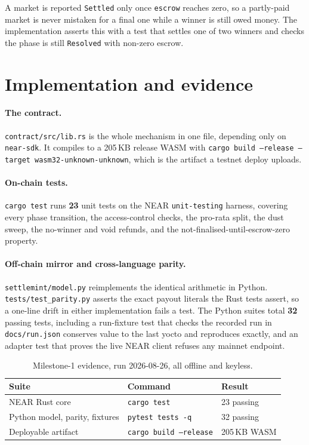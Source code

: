 \documentclass[11pt]{article}
\begin{document}
A market is reported \texttt{Settled} only once \texttt{escrow} reaches zero, so
a partly-paid market is never mistaken for a final one while a winner is still
owed money. The implementation asserts this with a test that settles one of two
winners and checks the phase is still \texttt{Resolved} with non-zero escrow.

\section{Implementation and evidence}

\paragraph{The contract.} \texttt{contract/src/lib.rs} is the whole mechanism in
one file, depending only on \texttt{near-sdk}. It compiles to a 205\,KB release
WASM with \texttt{cargo build --release --target wasm32-unknown-unknown}, which is
the artifact a testnet deploy uploads.

\paragraph{On-chain tests.} \texttt{cargo test} runs \textbf{23} unit tests on
the NEAR \texttt{unit-testing} harness, covering every phase transition, the
access-control checks, the pro-rata split, the dust sweep, the no-winner and void
refunds, and the not-finalised-until-escrow-zero property.

\paragraph{Off-chain mirror and cross-language parity.}
\texttt{settlemint/model.py} reimplements the identical arithmetic in Python.
\texttt{tests/test\_parity.py} asserts the exact payout literals the Rust tests
assert, so a one-line drift in either implementation fails a test. The Python
suites total \textbf{32} passing tests, including a run-fixture test that checks
the recorded run in \texttt{docs/run.json} conserves value to the last yocto and
reproduces exactly, and an adapter test that proves the live NEAR client refuses
any mainnet endpoint.

\begin{table}[h]
\centering
\begin{tabular}{lll}
\toprule
Suite & Command & Result \\
\midrule
NEAR Rust core & \texttt{cargo test} & 23 passing \\
Python model, parity, fixtures & \texttt{pytest tests -q} & 32 passing \\
Deployable artifact & \texttt{cargo build --release} & 205\,KB WASM \\
\bottomrule
\end{tabular}
\caption{Milestone-1 evidence, run 2026-08-26, all offline and keyless.}
\end{table}
\end{document}
